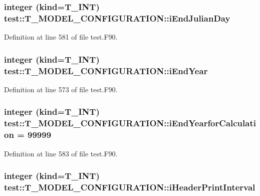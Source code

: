 \hypertarget{typetest_1_1_t___m_o_d_e_l___c_o_n_f_i_g_u_r_a_t_i_o_n_a505c58e377653d1063a50f56fc081fff}{
\subsubsection[{iEndJulianDay}]{\setlength{\rightskip}{0pt plus 5cm}integer (kind={\bf T\_\-INT}) {\bf test::T\_\-MODEL\_\-CONFIGURATION::iEndJulianDay}}}
\label{typetest_1_1_t___m_o_d_e_l___c_o_n_f_i_g_u_r_a_t_i_o_n_a505c58e377653d1063a50f56fc081fff}


Definition at line 581 of file test.F90.

\hypertarget{typetest_1_1_t___m_o_d_e_l___c_o_n_f_i_g_u_r_a_t_i_o_n_a15a227ddde1a80d2e93593de03689fcd}{
\subsubsection[{iEndYear}]{\setlength{\rightskip}{0pt plus 5cm}integer (kind={\bf T\_\-INT}) {\bf test::T\_\-MODEL\_\-CONFIGURATION::iEndYear}}}
\label{typetest_1_1_t___m_o_d_e_l___c_o_n_f_i_g_u_r_a_t_i_o_n_a15a227ddde1a80d2e93593de03689fcd}


Definition at line 573 of file test.F90.

\hypertarget{typetest_1_1_t___m_o_d_e_l___c_o_n_f_i_g_u_r_a_t_i_o_n_ab0bc33153f6bf665d6444258b59340c6}{
\subsubsection[{iEndYearforCalculation}]{\setlength{\rightskip}{0pt plus 5cm}integer (kind={\bf T\_\-INT}) {\bf test::T\_\-MODEL\_\-CONFIGURATION::iEndYearforCalculation} = 99999}}
\label{typetest_1_1_t___m_o_d_e_l___c_o_n_f_i_g_u_r_a_t_i_o_n_ab0bc33153f6bf665d6444258b59340c6}


Definition at line 583 of file test.F90.

\hypertarget{typetest_1_1_t___m_o_d_e_l___c_o_n_f_i_g_u_r_a_t_i_o_n_a142f03fa1eb88edd013259ce111abdc6}{
\subsubsection[{iHeaderPrintInterval}]{\setlength{\rightskip}{0pt plus 5cm}integer (kind={\bf T\_\-INT}) {\bf test::T\_\-MODEL\_\-CONFIGURATION::iHeaderPrintInterval}}}
\label{typetest_1_1_t___m_o_d_e_l___c_o_n_f_i_g_u_r_a_t_i_o_n_a142f03fa1eb88edd013259ce111abdc6}


